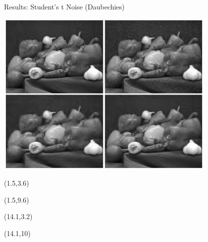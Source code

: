 \documentclass[12pt]{beamer}
\begin{document}
\begin{frame}{Results: Student's t Noise (Daubechies)}
\begin{center}
\vspace{-3 mm}
\includegraphics[width = 0.8\textwidth]{../figures/waveletStudentD.pdf} 
\end{center}

\begin{textblock}{5}(1.5,3.6)
\end{textblock}

\begin{textblock}{5}(1.5,9.6)
\end{textblock}

\begin{textblock}{5}(14.1,3.2)
\end{textblock}

\begin{textblock}{5}(14.1,10)
\end{textblock}
\end{frame}
\end{document}
